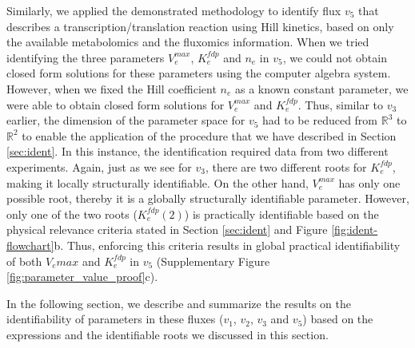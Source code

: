 \documentclass[10pt]{article}
\begin{document}
	Similarly, we applied the demonstrated methodology to identify flux $v_5$ that describes a transcription/translation reaction using Hill kinetics, based on only the available metabolomics and the fluxomics information. When we tried identifying the three parameters $V_e^{max}$, $K_e^{fdp}$ and $n_e$ in $v_5$, we could not obtain closed form solutions for these parameters using the computer algebra system. However, when we fixed the Hill coefficient $n_e$ as a known constant parameter, we were able to obtain closed form solutions for $V_e^{max}$ and $K_e^{fdp}$. Thus, similar to $v_3$ earlier, the dimension of the parameter space for $v_5$ had to be reduced from $\mathbb{R}^3$ to $\mathbb{R}^2$ to enable the application of the procedure that we have described in Section \ref{sec:ident}. In this instance, the identification required data from two different experiments. Again, just as we see for $v_3$, there are two different roots for $K_e^{fdp}$, making it locally structurally identifiable. On the other hand, $V_e^{max}$ has only one possible root, thereby it is a globally structurally identifiable parameter. However, only one of the two roots ($K_e^{fdp}(2)$) is practically identifiable based on the physical relevance criteria stated in Section \ref{sec:ident} and Figure \ref{fig:ident-flowchart}b. Thus, enforcing this criteria results in global practical identifiability of both $V_e{max}$ and $K_e^{fdp}$ in $v_5$ (Supplementary Figure \ref{fig:parameter_value_proof}c).	
		
	In the following section, we describe and summarize the results on the identifiability of parameters in these fluxes ($v_1$, $v_2$, $v_3$ and $v_5$) based on the expressions and the identifiable roots we discussed in this section.
	
\end{document}
